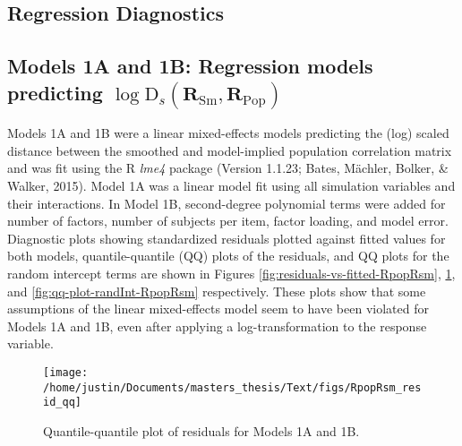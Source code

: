 \documentclass[
  english,
  man]{apa6}
\begin{document}
\begin{appendix}
\hypertarget{regression-diagnostics}{%
\section{Regression Diagnostics}\label{regression-diagnostics}}

\hypertarget{models-1a-and-1b-regression-models-predicting-log-textrmd_smathbfr_textrmsm-mathbfr_textrmpop}{%
\subsection{\texorpdfstring{Models 1A and 1B: Regression models
predicting
\(\log \textrm{D}_s(\mathbf{R}_{\textrm{Sm}}, \mathbf{R}_{\textrm{Pop}})\)}{Models 1A and 1B: Regression models predicting \textbackslash log \textbackslash textrm\{D\}\_s(\textbackslash mathbf\{R\}\_\{\textbackslash textrm\{Sm\}\}, \textbackslash mathbf\{R\}\_\{\textbackslash textrm\{Pop\}\})}}\label{models-1a-and-1b-regression-models-predicting-log-textrmd_smathbfr_textrmsm-mathbfr_textrmpop}}

Models 1A and 1B were a linear mixed-effects models predicting the (log)
scaled distance between the smoothed and model-implied population
correlation matrix and was fit using the R \emph{lme4} package (Version
1.1.23; Bates, Mächler, Bolker, \& Walker, 2015). Model 1A was a linear
model fit using all simulation variables and their interactions. In
Model 1B, second-degree polynomial terms were added for number of
factors, number of subjects per item, factor loading, and model error.
Diagnostic plots showing standardized residuals plotted against fitted
values for both models, quantile-quantile (QQ) plots of the residuals,
and QQ plots for the random intercept terms are shown in Figures
\ref{fig:residuals-vs-fitted-RpopRsm}, \ref{fig:qq-plot-RpopRsm}, and
\ref{fig:qq-plot-randInt-RpopRsm} respectively. These plots show that
some assumptions of the linear mixed-effects model seem to have been
violated for Models 1A and 1B, even after applying a log-transformation
to the response variable.

\begin{figure}

{\centering \texttt{[image: /home/justin/Documents/masters\_thesis/Text/figs/RpopRsm\_resid\_qq]} 

}

\caption{Quantile-quantile plot of residuals for Models 1A and 1B.}\label{fig:qq-plot-RpopRsm}
\end{figure}


\end{appendix}
\end{document}
